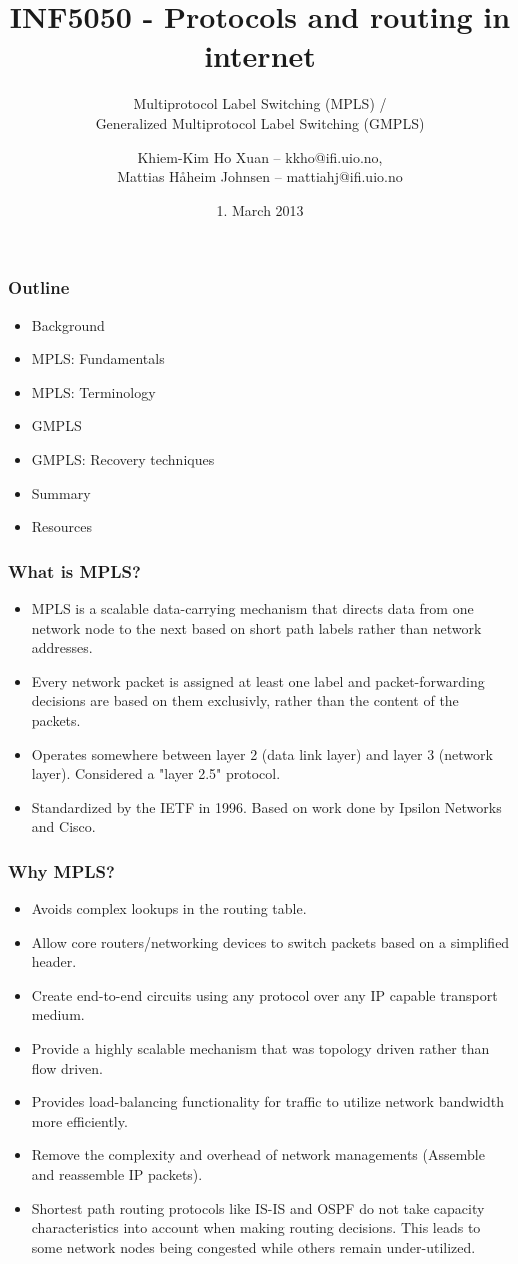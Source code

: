 \documentclass[12pt]{beamer}
\title[]{INF5050 - Protocols and routing in internet}
\subtitle[]{Multiprotocol Label Switching (MPLS) / \\
			Generalized Multiprotocol Label Switching (GMPLS) }
\author{Khiem-Kim Ho Xuan -- kkho@ifi.uio.no, \\
		Mattias H{\aa}heim Johnsen -- mattiahj@ifi.uio.no}
\date{1. March 2013}
\begin{document}
\begin{frame}
  \titlepage
\end{frame}

\begin{frame}
  \frametitle{Outline}
  \begin{itemize}
  \item Background
  \item MPLS: Fundamentals
  \item MPLS: Terminology
  \item GMPLS
  \item GMPLS: Recovery techniques
  \item Summary
  \item Resources 
  \end{itemize}
\end{frame}

\begin{frame}
  \frametitle{What is MPLS?}
	\begin{itemize}
	    \item MPLS is a scalable data-carrying mechanism that directs data from one network node to the next based on short path labels rather than network addresses.
        \item Every network packet is assigned at least one label and packet-forwarding decisions are based on them exclusivly, rather than the content of the packets.
        \item Operates somewhere between layer 2 (data link layer) and layer 3 (network layer). Considered a "layer 2.5" protocol.
        \item Standardized by the IETF in 1996. Based on work done by Ipsilon Networks and Cisco.
	\end{itemize}
\end{frame}

\begin{frame}
  \frametitle{Why MPLS?}
	\begin{itemize}
        \item Avoids complex lookups in the routing table.
		\item Allow core routers/networking devices to switch packets based on a simplified header.
        \item Create end-to-end circuits using any protocol over any IP capable transport medium.
		\item Provide a highly scalable mechanism that was topology driven rather than flow driven.
		\item Provides load-balancing functionality for traffic to utilize network bandwidth more efficiently.
		\item Remove the complexity and overhead of network managements (Assemble and reassemble IP packets).		
        \item Shortest path routing protocols like IS-IS and OSPF do not take capacity characteristics into account when making routing decisions. This leads to some network nodes being congested while others remain under-utilized.
	\end{itemize}
\end{frame}
\end{document}
